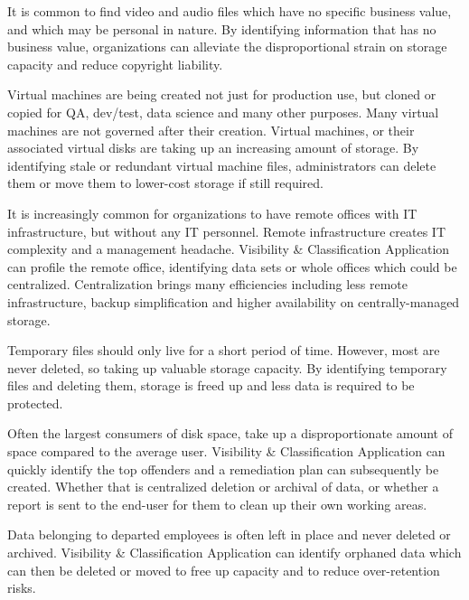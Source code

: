 \documentclass[letterpaper,10pt,english]{sphinxhowto}
\begin{document}
 It is common to find video and audio files which have no specific business value, and which may be personal in nature. By identifying information that has no business value, organizations can alleviate the disproportional strain on storage capacity and reduce copyright liability.

 Virtual machines are being created not just for production use, but cloned or copied for QA, dev/test, data science and many other purposes. Many virtual machines are not governed after their creation. Virtual machines, or their associated virtual disks are taking up an increasing amount of storage. By identifying stale or redundant virtual machine files, administrators can delete them or move them to lower-cost storage if still required.

 It is increasingly common for organizations to have remote offices with IT infrastructure, but without any IT personnel. Remote infrastructure creates IT complexity and a management headache. Visibility \& Classification Application can profile the remote office, identifying data sets or whole offices which could be centralized. Centralization brings many efficiencies including less remote infrastructure, backup simplification and higher availability on centrally-managed storage.

 Temporary files should only live for a short period of time. However, most are never deleted, so taking up valuable storage capacity. By identifying temporary files and deleting them, storage is freed up and less data is required to be protected.

 Often the largest consumers of disk space, take up a disproportionate amount of space compared to the average user. Visibility \& Classification Application can quickly identify the top offenders and a remediation plan can subsequently be created. Whether that is centralized deletion or archival of data, or whether a report is sent to the end-user for them to clean up their own working areas.

 Data belonging to departed employees is often left in place and never deleted or archived. Visibility \& Classification Application can identify orphaned data which can then be deleted or moved to free up capacity and to reduce over-retention risks.
\end{document}
